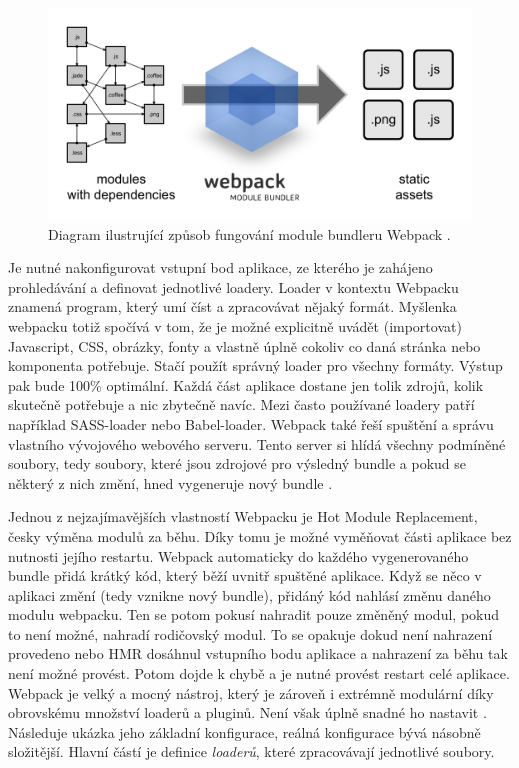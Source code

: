 \begin{figure}[h]
\begin{centering}
\includegraphics[scale=0.7]{obrazky/webpack}
\par\end{centering}
\caption{Diagram ilustrující způsob fungování module bundleru Webpack \cite{webpack_book}. \label{fig:webpack}}
\end{figure}
\FloatBarrier

Je nutné nakonfigurovat vstupní bod aplikace, ze kterého je zahájeno prohledávání a definovat jednotlivé loadery. Loader v kontextu Webpacku znamená program, který umí číst a zpracovávat nějaký formát. Myšlenka webpacku totiž spočívá v tom, že je možné explicitně uvádět (importovat) Javascript, CSS, obrázky, fonty a vlastně úplně cokoliv co daná stránka nebo komponenta potřebuje. Stačí použít správný loader pro všechny formáty. Výstup pak bude 100\% optimální. Každá část aplikace dostane jen tolik zdrojů, kolik skutečně potřebuje a nic zbytečně navíc. Mezi často používané loadery patří například SASS-loader nebo Babel-loader. Webpack také řeší spuštění a správu vlastního vývojového webového serveru. Tento server si hlídá všechny podmíněné soubory, tedy soubory, které jsou zdrojové pro výsledný bundle a pokud se některý z nich změní, hned vygeneruje nový bundle \cite{webpack} \cite{webpack_book}.

Jednou z nejzajímavějších vlastností Webpacku je Hot Module Replacement, česky výměna modulů za běhu. Díky tomu je možné vyměňovat části aplikace bez nutnosti jejího restartu. Webpack automaticky do každého vygenerovaného bundle přidá krátký kód, který běží uvnitř spuštěné aplikace. Když se něco v aplikaci změní (tedy vznikne nový bundle), přidáný kód nahlásí změnu daného modulu webpacku. Ten se potom pokusí nahradit pouze změněný modul, pokud to není možné, nahradí rodičovský modul. To se opakuje dokud není nahrazení provedeno nebo HMR dosáhnul vstupního bodu aplikace a nahrazení za běhu tak není možné provést. Potom dojde k chybě a je nutné provést restart celé aplikace. Webpack je velký a mocný nástroj, který je zároveň i extrémně modulární díky obrovskému množství loaderů a pluginů. Není však úplně snadné ho nastavit \cite{webpack} \cite{webpack_book}. Následuje ukázka jeho základní konfigurace, reálná konfigurace bývá násobně složitější. Hlavní částí je definice \textit{loaderů}, které zpracovávají jednotlivé soubory. 

